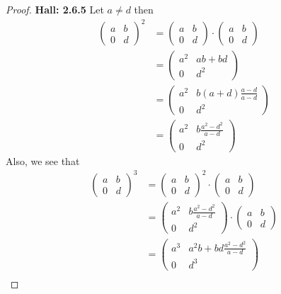 \documentclass[11pt]{article}
\theoremstyle{definition}
\begin{document}
\cleardoublepage
\begin{proof}{\textbf{Hall: 2.6.5}}
    Let $a \neq d$ then
    \begin{align*}
        \begin{pmatrix} a & b\\ 0 & d \end{pmatrix}^2
        &= \begin{pmatrix} a & b\\ 0 & d \end{pmatrix}
        \cdot \begin{pmatrix} a & b\\ 0 & d \end{pmatrix}\\
        &= \begin{pmatrix} a^2 & ab + bd\\ 0 & d^2 \end{pmatrix}\\
        &= \begin{pmatrix} a^2 & b(a + d)\frac{a - d}{a - d}\\ 0 & d^2 \end{pmatrix}\\
        &= \begin{pmatrix} a^2 & b\frac{a^2 - d^2}{a - d}\\ 0 & d^2 \end{pmatrix}
    \end{align*}
    Also, we see that
    \begin{align*}
        \begin{pmatrix} a & b\\ 0 & d \end{pmatrix}^3
        &= \begin{pmatrix} a & b\\ 0 & d \end{pmatrix}^2
        \cdot \begin{pmatrix} a & b\\ 0 & d \end{pmatrix}\\
        &= \begin{pmatrix} a^2 & b\frac{a^2 - d^2}{a - d}\\ 0 & d^2 \end{pmatrix}
        \cdot \begin{pmatrix} a & b\\ 0 & d \end{pmatrix}\\
        &= \begin{pmatrix} a^3 & a^2b + bd\frac{a^2 - d^2}{a - d}\\ 0 & d^3\end{pmatrix}\\

\end{align*}
\end{proof}
\end{document}
